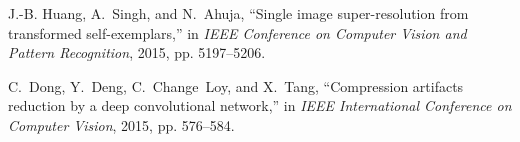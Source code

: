 \documentclass[journal]{IEEEtran}
\begin{document}
\begin{thebibliography}{10}
J.-B. Huang, A.~Singh, and N.~Ahuja, ``Single image super-resolution from
  transformed self-exemplars,'' in \emph{IEEE Conference on Computer Vision and
  Pattern Recognition}, 2015, pp. 5197--5206.

C.~Dong, Y.~Deng, C.~Change~Loy, and X.~Tang, ``Compression artifacts reduction
  by a deep convolutional network,'' in \emph{IEEE International Conference on
  Computer Vision}, 2015, pp. 576--584.

\end{thebibliography}
\end{document}
